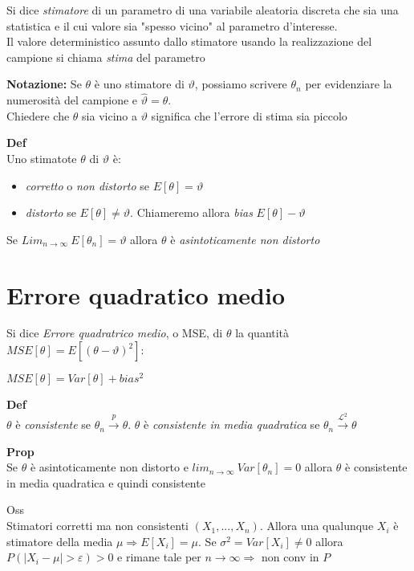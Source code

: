 \documentclass[11pt, letterpaper]{article}
\begin{document}
Si dice \textit{stimatore} di un parametro di una variabile aleatoria discreta che sia una statistica e il cui
valore sia "spesso vicino" al parametro d'interesse.\\ Il valore deterministico assunto dallo stimatore usando la
realizzazione del campione si chiama \textit{stima} del parametro

\textbf{Notazione:} Se $\theta$ è uno stimatore di $\vartheta$, possiamo scrivere $\theta_{n}$ per evidenziare la 
numerosità del campione e $\hat{\vartheta}=\theta$.\\ Chiedere che $\theta$ sia vicino a $\vartheta$ significa che 
l'errore di stima sia piccolo

\textbf{Def}\\Uno stimatote $\theta$ di $\vartheta$ è:
\begin{itemize}
    \item \textit{corretto} o \textit{non distorto} se $E[\theta]=\vartheta$
    \item \textit{distorto} se $E[\theta]\neq\vartheta$. Chiameremo allora \textit{bias} $E[\theta]-\vartheta$
\end{itemize}
Se $Lim_{n\to\infty}\ E[\theta_{n}]=\vartheta$ allora $\theta$ è \textit{asintoticamente non distorto}

\section{Errore quadratico medio}
Si dice \textit{Errore quadratrico medio}, o MSE, di $\theta$ la quantità $MSE[\theta]=E[(\theta-\vartheta)^{2}]$:
\begin{center}
    $MSE[\theta]=Var[\theta]+bias^{2}$
\end{center}

\textbf{Def}\\$\theta$ è \textit{consistente} se $\theta_{n}\xrightarrow{p}\theta$. $\theta$ è \textit{consistente
in media quadratica} se $\theta_{n}\xrightarrow{\mathcal{L}^{2}}\theta$

\textbf{Prop}\\Se $\theta$ è asintoticamente non distorto e $lim_{n\to\infty}\ Var[\theta_{n}]=0$ allora $\theta$
è consistente in media quadratica e quindi consistente

Oss\\ Stimatori corretti ma non consistenti $(X_{1},...,X_{n})$. Allora una qualunque $X_{i}$ è stimatore della
media $\mu\Rightarrow E[X_{i}]=\mu$. Se $\sigma^{2}=Var[X_{i}]\neq 0$ allora $P(|X_{i}-\mu|>\varepsilon)>0$ e 
rimane tale per $n\to\infty\Rightarrow$ non conv in $P$
\end{document}

